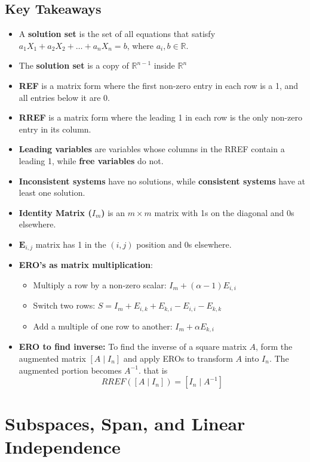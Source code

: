 \documentclass[a4paper, 9pt]{extarticle}
\begin{document}
\subsection{Key Takeaways}
\begin{takeaway-box}{}{}
\begin{itemize}
  \item A \textbf{solution set} is the set of all equations that satisfy $a_1X_1 + a_2X_2 + \ldots + a_nX_n = b$, where $a_i, b \in \mathbb{R}$.
  \item The \textbf{solution set} is a copy of $\mathbb{R}^{n-1}$ inside $\mathbb{R}^n$
  \item \textbf{REF} is a matrix form where the first non-zero entry in each row is a 1, and all entries below it are 0.
  \item \textbf{RREF} is a matrix form where the leading 1 in each row is the only non-zero entry in its column.
  \item \textbf{Leading variables} are variables whose columns in the RREF contain a leading 1, while \textbf{free variables} do not.
  \item \textbf{Inconsistent systems} have no solutions, while \textbf{consistent systems} have at least one solution.
  \item \textbf{Identity Matrix ($I_m$)} is an $m \times m$ matrix with 1s on the diagonal and 0s elsewhere.
  \item \textbf{$\boldsymbol{E}_{i,j}$} matrix has 1 in the $(i,j)$ position and 0s elsewhere.
  \item \textbf{ERO's as matrix multiplication}:
        \begin{itemize}
          \item Multiply a row by a non-zero scalar: $I_m + (\alpha - 1)E_{i,i}$
          \item Switch two rows: $S = I_m + E_{i,k} + E_{k,i} - E_{i,i} - E_{k,k}$
          \item Add a multiple of one row to another: $I_m + \alpha E_{k,i}$
        \end{itemize}
  \item \textbf{ERO to find inverse:} To find the inverse of a square matrix $A$, form the augmented matrix $[A \mid I_n]$ and apply EROs to transform $A$ into $I_n$. The augmented portion becomes $A^{-1}$. that is $$RREF([A \mid I_n]) = [I_n \mid A^{-1}]$$
\end{itemize}
\end{takeaway-box}
\pagebreak
\section{Subspaces, Span, and Linear Independence}
\end{document}
